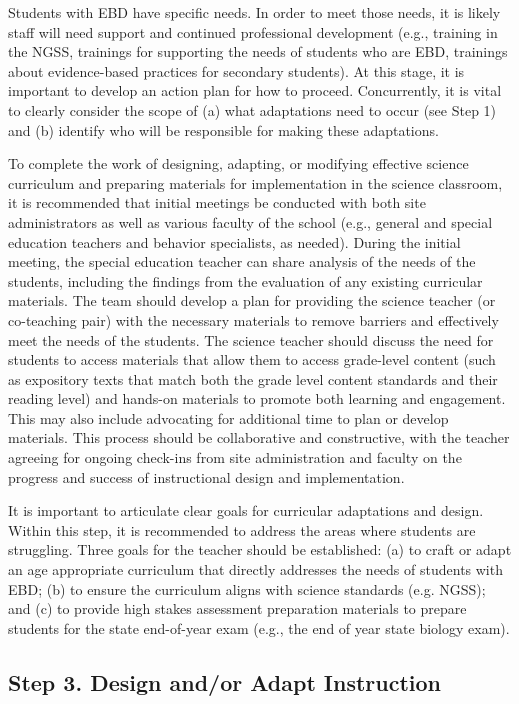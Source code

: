 \documentclass[11.5pt]{sig-alternate} %
\begin{document}
\begin{large}
Students with EBD have specific needs. In order to meet those needs, it is likely staff will need support and continued professional development (e.g., training in the NGSS, trainings for supporting the needs of students who are EBD, trainings about evidence-based practices for secondary students). At this stage, it is important to develop an action plan for how to proceed. Concurrently, it is vital to clearly consider the scope of (a) what adaptations need to occur (see Step 1) and (b) identify who will be responsible for making these adaptations. 

To complete the work of designing, adapting, or modifying effective science curriculum and preparing materials for implementation in the science classroom, it is recommended that initial meetings be conducted with both site administrators as well as various faculty of the school (e.g., general and special education teachers and behavior specialists, as needed). During the initial meeting, the special education teacher can share analysis of the needs of the students, including the findings from the evaluation of any existing curricular materials. The team should develop a plan for providing the science teacher (or co-teaching pair) with the necessary materials to remove barriers and effectively meet the needs of the students. The science teacher should discuss the need for students to access materials that allow them to access grade-level content (such as expository texts that match both the grade level content standards and their reading level) and hands-on materials to promote both learning and engagement. This may also include advocating for additional time to plan or develop materials. This process should be collaborative and constructive, with the teacher agreeing for ongoing check-ins from site administration and faculty on the progress and success of instructional design and implementation. 

It is important to articulate clear goals for curricular adaptations and design. Within this step, it is recommended to address the areas where students are struggling. Three goals for the teacher should be established: (a) to craft or adapt an age appropriate curriculum that directly addresses the needs of students with EBD; (b) to ensure the curriculum aligns with science standards (e.g. NGSS); and (c) to provide high stakes assessment preparation materials to prepare students for the state end-of-year exam (e.g., the end of year state biology exam).

\subsection*{Step 3. Design and/or Adapt Instruction}


\end{large}
\end{document}
